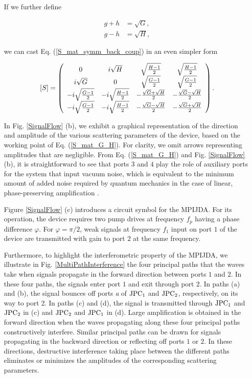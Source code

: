 \documentclass[aip,onecolumn,10pt]{revtex4}%
\begin{document}
If we further define 

\begin{align}
g+h &  =\sqrt{G},\label{sqrtG}\\
g-h &  =\sqrt{H},\label{sqrtH}%
\end{align}

we can cast Eq. (\ref{S_mat_symm_back_coup}) in an even simpler form%

\begin{equation}
\left[  S\right]  =\left(
\begin{array}
[c]{cccc}%
0 & i\sqrt{H} & \sqrt{\frac{H-1}{2}} & \sqrt{\frac{H-1}{2}}\\
i\sqrt{G} & 0 & \sqrt{\frac{G-1}{2}} & \sqrt{\frac{G-1}{2}}\\
-i\sqrt{\frac{G-1}{2}} & -i\sqrt{\frac{H-1}{2}} & -\frac{\sqrt{G}+\sqrt{H}}{2}
& -\frac{\sqrt{G}-\sqrt{H}}{2}\\
-i\sqrt{\frac{G-1}{2}} & -i\sqrt{\frac{H-1}{2}} & -\frac{\sqrt{G}-\sqrt{H}}{2} &
-\frac{\sqrt{G}+\sqrt{H}}{2}%
\end{array}
\right).  \label{S_mat_G_H}%
\end{equation}

In Fig. \ref{SignalFlow} (b), we exhibit a graphical representation of the direction and amplitude of the various scattering parameters of the device, based on the working point of Eq. (\ref{S_mat_G_H}). For clarity, we omit arrows representing amplitudes that are negligible. From Eq. (\ref{S_mat_G_H}) and Fig. \ref{SignalFlow} (b), it is straightforward to see that ports $3$ and $4$ play the role of auxiliary ports for the system that input vacuum noise, which is equivalent to the minimum amount of added noise required by quantum mechanics in the case of linear, phase-preserving amplification \cite{Caves,NoiseAmplReview}.     

Figure \ref{SignalFlow} (c) introduces a circuit symbol for the MPIJDA. For its operation, the device requires two pump drives at frequency $f_p$ having a phase difference $\varphi$. For $\varphi=\pi/2$, weak signals at frequency $f_1$ input on port $1$ of the device are transmitted with gain to port $2$ at the same frequency.  

Furthermore, to highlight the interferometric property of the MPIJDA, we illustrate in Fig. \ref{MultiPathInterference} the four principal paths that the waves take when signals propagate in the forward direction between ports $1$ and $2$. In these four paths, the signals enter port $1$ and exit through port $2$. In paths (a) and (b), the signal bounces off ports \textit{a} of $\rm{JPC_1}$ and $\rm{JPC_2}$, respectively, on its way to port 2. In paths (c) and (d), the signal is transmitted through $\rm{JPC_1}$ and $\rm{JPC_2}$ in (c) and $\rm{JPC_2}$ and $\rm{JPC_1}$ in (d). Large amplification is obtained in the forward direction when the waves propagating along these four principal paths constructively interfere. Similar principal paths can be drawn for signals propagating in the backward direction or reflecting off ports $1$ or $2$. In these directions, destructive interference taking place between the different paths eliminates or minimizes the amplitudes of the corresponding scattering parameters.    
\end{document}
